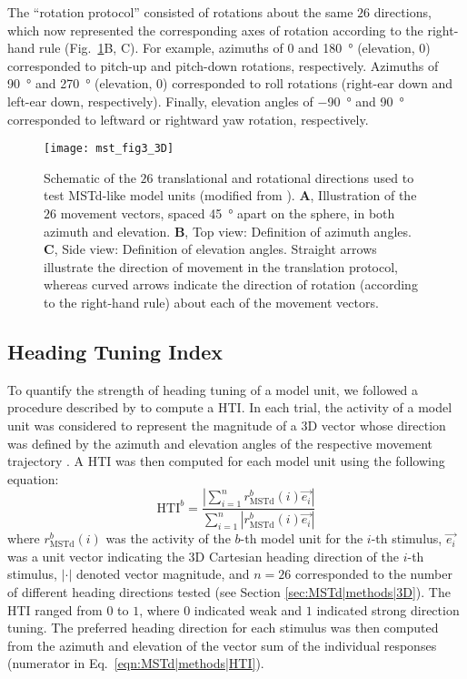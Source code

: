 The ``rotation protocol'' consisted of rotations about the same $26$ directions,
which now represented the corresponding axes of rotation according to the 
right-hand rule (Fig.~\ref{fig:MSTd|3D}B, C). For example, azimuths of $0$ and
\SI{180}{\degree} (elevation, $0$) corresponded to pitch-up and pitch-down 
rotations, respectively. Azimuths of \SI{90}{\degree} and \SI{270}{\degree}
(elevation, $0$) corresponded to roll rotations (right-ear down and 
left-ear down, respectively). Finally, elevation angles of \SI{-90}{\degree}
and \SI{+90}{\degree} corresponded to leftward or rightward yaw rotation,
respectively.

\begin{figure}[t]
  \centering
  \texttt{[image: mst\_fig3\_3D]}
  \caption{
  Schematic of the $26$ translational and rotational directions used to test 
  \ac{MSTd}-like model units (modified from \cite{Takahashi2007}). 
  \textbf{A}, Illustration of the $26$ movement vectors, spaced \SI{45}{\degree}
  apart on the sphere, in both azimuth and elevation. 
  \textbf{B}, Top view: Definition of azimuth angles. 
  \textbf{C}, Side view: Definition of elevation angles. Straight arrows 
  illustrate the direction of movement in the translation protocol, whereas 
  curved arrows indicate the direction of rotation (according to the right-hand
  rule) about each of the movement vectors.}
  \label{fig:MSTd|3D}
\end{figure}


\subsection{Heading Tuning Index}
\label{sec:MSTd|methods|HTI}
To quantify the strength of heading tuning of a model unit, we followed a 
procedure described by \cite{Gu2006} to compute a \acf{HTI}. 
In each trial, the activity of a model unit was considered to represent the
magnitude of a 3D vector whose direction was defined by the azimuth and 
elevation angles of the respective movement trajectory \citep{Gu2006}.
A \ac{HTI} was then computed for each model unit using the following equation:
\begin{equation}
\mathrm{HTI}^b = \frac{|\sum_{i=1}^n r^b_{\textrm{MSTd}}(i) \vec{e_i}|}{\sum_{i=1}^n |r^b_{\textrm{MSTd}}(i) \vec{e_i}|} 
\label{eqn:MSTd|methods|HTI}
\end{equation}
where $r_{\textrm{MSTd}}^b (i)$ was the activity of the $b$-th model unit for
the $i$-th stimulus, $\vec{e_i}$ was a unit vector indicating the 3D Cartesian
heading direction of the $i$-th stimulus, $|\cdot|$ denoted vector magnitude, 
and $n=26$ corresponded to the number of different heading directions tested
(see Section \ref{sec:MSTd|methods|3D}).
The \ac{HTI} ranged from $0$ to $1$, where $0$ indicated weak and $1$ 
indicated strong direction tuning. The preferred heading direction for each
stimulus was then computed from the azimuth and elevation of the vector sum 
of the individual responses (numerator in Eq.~\ref{eqn:MSTd|methods|HTI}).


